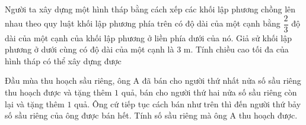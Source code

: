 \begin{bt}%

	Người ta xây dựng một hình tháp bằng cách xếp các khối lập phương chồng lên nhau theo quy luật khối lập phương phía trên có độ dài của một cạnh bằng $\dfrac{2}{3}$ độ dài của một cạnh của khối lập phương ở liền phía dưới của nó. Giả sử khối lập phương ở dưới cùng có độ dài của một cạnh là $3$ m. Tính chiều cao tối đa của hình tháp có thể xây dựng được
\end{bt}

\begin{bt}%

	Đầu mùa thu hoạch sầu riêng, ông A đã bán cho người thứ nhất nửa số sầu riêng thu hoạch được và tặng thêm $1$ quả, bán cho người thứ hai nửa số sầu riêng còn lại và tặng thêm $1$ quả. Ông cứ tiếp tục cách bán như trên thì đến người thứ bảy số sầu riêng của ông được bán hết. Tính số sầu riêng mà ông A thu hoạch được.
\end{bt}

